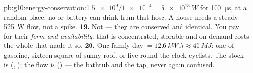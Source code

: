 \begin{solution}{pb:g10:energy-conservation:1}
$\num{5e9}/\num{1e-4} = \qty{5e13}{W}$ for \qty{100}{\micro s}, at
a random place: no  or battery can drink from that hose.
A house needs a steady \qty{525}{W} flow, not a spike.
\textbf{19.} Not  --- they are conserved and identical. You
pay for their \emph{form and availability}:  that is
concentrated, storable and on demand costs the whole  that made it so.
\textbf{20.} One family day $= \qty{12.6}{kW.h} \approx
\qty{45}{MJ}$: one  of gasoline, sixteen square  of
sunny roof, or five round-the-clock cyclists. The stock is 
(, ); the flow is  () --- the bathtub
and the tap, never again confused.
\end{solution}
